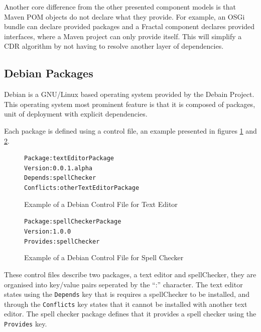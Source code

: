 Another core difference from the other presented component models is that Maven POM objects do not declare what they provide.
For example, an OSGi bundle can declare provided packages and a Fractal component declares provided interfaces, where a Maven project can only provide itself.
This will simplify a CDR algorithm by not having to resolve another layer of dependencies.

\subsection{Debian Packages}
Debian is a GNU/Linux based operating system provided by the Debain Project.
This operating system most prominent feature is that it is composed of packages, unit of deployment with explicit dependencies.

Each package is defined using a control file, an example presented in figures \ref{debianmetadatate} and \ref{debianmetadatasc}.

\begin{figure}[htp]
\begin{center}
\begin{alltt}
Package: textEditorPackage
Version: 0.0.1.alpha
Depends: spellChecker
Conflicts: otherTextEditorPackage
\end{alltt}
  \caption[Debian Control file for Text Editor]{Example of a Debian Control File for Text Editor}
  \label{debianmetadatate}
\end{center}
\end{figure}

\begin{figure}[htp]
\begin{center}
\begin{alltt}
Package: spellCheckerPackage
Version: 1.0.0
Provides: spellChecker
\end{alltt}
  \caption[Debian Control files for Spell Checker]{Example of a Debian Control File for Spell Checker}
  \label{debianmetadatasc}
\end{center}
\end{figure}

These control files describe two packages, a text editor and spellChecker, they are organised into key/value pairs seperated by the ``:'' character.
The text editor states using the \verb+Depends+ key that is requires a spellChecker to be installed, 
and through the \verb+Conflicts+ key states that it cannot be installed with another text editor.
The spell checker package defines that it provides a spell checker  using the \verb+Provides+ key.

